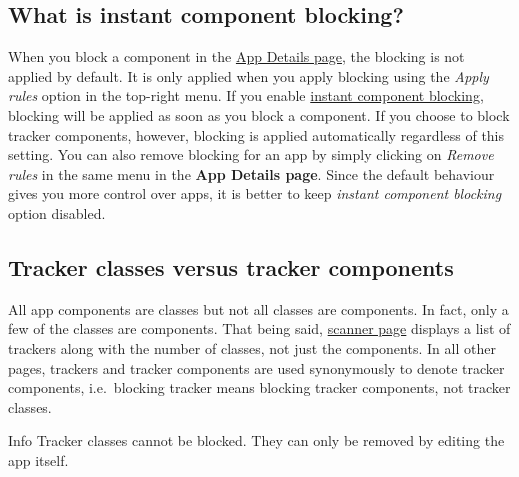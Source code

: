 \subsection{What is instant component blocking?}\label{subsec:faq:what-is-instant-component-blocking} %
When you block a component in the \hyperref[sec:app-details-page]{App Details page}, the blocking is not applied by
default. It is only applied when you apply blocking using the \textit{Apply rules} option in the top-right menu. If you
enable \hyperref[subsubsec:instant-component-blocking]{instant component blocking}, blocking will be applied as soon as you block a component. If you choose to
block tracker components, however, blocking is applied automatically regardless of this setting. You can also remove
blocking for an app by simply clicking on \textit{Remove rules} in the same menu in the \textbf{App Details page}. Since
the default behaviour gives you more control over apps, it is better to keep \textit{instant component blocking} option
disabled.

\subsection{Tracker classes versus tracker components}\label{subsec:tracker-classes-versus-tracker-components} %
All app components are classes but not all classes are components. In fact, only a few of the classes are components.
That being said, \hyperref[sec:scanner-page]{scanner page} displays a list of trackers along with the number of classes,
not just the components. In all other pages, trackers and tracker components are used synonymously to denote tracker
components, i.e.\ blocking tracker means blocking tracker components, not tracker classes.

\begin{tip}{Info}
    Tracker classes cannot be blocked. They can only be removed by editing the app itself.
\end{tip}

